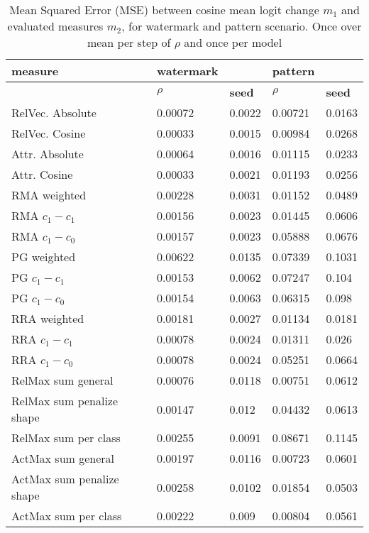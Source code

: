 \begin{table}[!ht]
    \centering
    \begin{tabular}{l|ll|ll}
    \hline
         \textbf{measure}& \textbf{watermark} &  & \textbf{pattern} &  \\ \hline
         & $\rho$ & \textbf{seed} & $\rho$  & \textbf{seed} \\ \hline
        RelVec. Absolute & 0.00072 & 0.0022 & 0.00721 & 0.0163 \\ 
        RelVec. Cosine & 0.00033 & 0.0015 & 0.00984 & 0.0268 \\ 
        Attr. Absolute & 0.00064 & 0.0016 & 0.01115 & 0.0233 \\ 
        Attr. Cosine & 0.00033 & 0.0021 & 0.01193 & 0.0256 \\  \hline
        RMA weighted & 0.00228 & 0.0031 & 0.01152 & 0.0489 \\ 
        RMA $c_1- c_1$ & 0.00156 & 0.0023 & 0.01445 & 0.0606 \\ 
        RMA $c_1 - c_0$ & 0.00157 & 0.0023 & 0.05888 & 0.0676 \\ 
        PG weighted & 0.00622 & 0.0135 & 0.07339 & 0.1031 \\ 
        PG $c_1- c_1$ & 0.00153 & 0.0062 & 0.07247 & 0.104 \\ 
        PG $c_1 - c_0$ & 0.00154 & 0.0063 & 0.06315 & 0.098 \\ 
        RRA weighted & 0.00181 & 0.0027 & 0.01134 & 0.0181 \\ 
        RRA $c_1- c_1$ & 0.00078 & 0.0024 & 0.01311 & 0.026 \\ 
        RRA $c_1 - c_0$ & 0.00078 & 0.0024 & 0.05251 & 0.0664 \\  \hline
        RelMax sum general & 0.00076 & 0.0118 & 0.00751 & 0.0612 \\ 
        RelMax sum penalize shape & 0.00147 & 0.012 & 0.04432 & 0.0613 \\ 
        RelMax sum per class & 0.00255 & 0.0091 & 0.08671 & 0.1145 \\ 
        ActMax sum general & 0.00197 & 0.0116 & 0.00723 & 0.0601 \\ 
        ActMax sum penalize shape & 0.00258 & 0.0102 & 0.01854 & 0.0503 \\ 
        ActMax sum per class & 0.00222 & 0.009 & 0.00804 & 0.0561 \\ \hline
    \end{tabular}
    \caption{Mean Squared Error (MSE) between cosine mean logit change $m_1$ and evaluated measures $m_2$, for watermark and pattern scenario. Once over mean per step of $\rho$ and once per model}
\end{table}